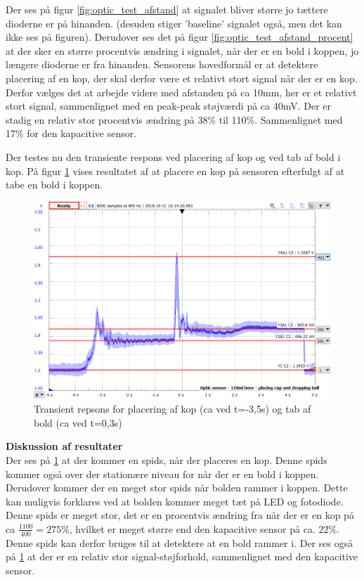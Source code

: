 \documentclass[HardwareDesign/HardwareDesign_main.tex]{subfiles}
\begin{document}
Der ses på figur \ref{fig:optic_test_afstand} at signalet bliver større jo tættere dioderne er på hinanden. (desuden stiger 'baseline' signalet også, men det kan ikke ses på figuren). Derudover ses det på figur \ref{fig:optic_test_afstand_procent} at der sker en større procentvis ændring i signalet, når der er en bold i koppen, jo længere dioderne er fra hinanden. Sensorens hovedformål er at detektere placering af en kop, der skal derfor være et relativt stort signal når der er en kop. Derfor vælges det at arbejde videre med afstanden på ca 10mm, her er et relativt stort signal, sammenlignet med en peak-peak støjværdi på ca 40mV. Der er stadig en relativ stor procentvis ændring på 38\% til 110\%. Sammenlignet med 17\% for den kapacitive sensor.

Der testes nu den transiente respons ved placering af kop og ved tab af bold i kop. På figur \ref{fig:optic_place_and_drop_110ml} vises resultatet af at placere en kop på sensoren efterfulgt af at tabe en bold i koppen.

\begin{figure}[H]
    \centering
    \includegraphics[width=\textwidth]{HardwareDesign/CupSensor/graphics/OpticTest/placingCupAndDroppingBall(110ml-beer).png}
    \caption{Transient repsons for placering af kop (ca ved t=-3,5s)  og tab af bold (ca ved t=0,3s)}
    \label{fig:optic_place_and_drop_110ml}
\end{figure}


\textbf{Diskussion af resultater}\\
Der ses på \ref{fig:optic_place_and_drop_110ml} at der kommer en spids, når der placeres en kop. Denne spids kommer også over der stationære niveau for når der er en bold i koppen. Derudover kommer der en meget stor spids når bolden rammer i koppen. Dette kan muligvis forklares ved at bolden kommer meget tæt på LED og fotodiode. Denne spids er meget stor, det er en procentvis ændring fra når der er en kop på ca $\frac{1100}{400} = 275\%$, hvilket er meget større end den kapacitive sensor på ca. 22\%. Denne spids kan derfor bruges til at detektere at en bold rammer i. Der ses også på \ref{fig:optic_place_and_drop_110ml} at der er en relativ stor signal-støjforhold, sammenlignet med den kapacitive sensor.
\end{document}

